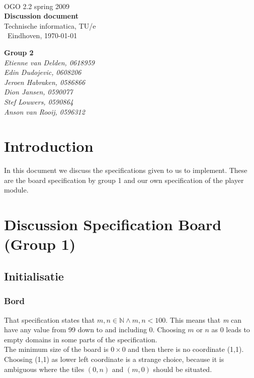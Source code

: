 \documentclass[a4paper,twoside,11pt]{article}
\begin{document}
   \begin{titlepage}
        {\ }\\[5.0cm]
        { {\Large OGO 2.2 spring 2009}}\\[0.2cm]
        {\bf \Huge Discussion document}\\[0.1cm]
        { {\Large {Technische informatica, TU/e} }}\\[1.0cm]
        {\ Eindhoven, \today }\\[0.2cm]
        \begin{flushright}
            {\bf {\small Group 2 }}\\[0.0cm]
            {\em {\small Etienne van Delden, 0618959}}\\
            {\em {\small Edin Dudojevic, 0608206}}\\
            {\em {\small Jeroen Habraken, 0586866}}\\
            {\em {\small Dion Jansen, 0590077 }}\\
            {\em {\small Stef Louwers, 0590864}}\\
            {\em {\small Anson van Rooij, 0596312}}\\[0.5cm]
        \end{flushright}
    \end{titlepage}

    \tableofcontents
\newpage

\section{Introduction} %
\label{cha:introduction}

In this document we discuss the specifications given to us to implement. These are the board specification by group 1 and our own specification of the player module.


\section{Discussion Specification Board (Group 1)} %
\label{cha:discussion_specification_board_group_1_}

\subsection{Initialisatie} %
\label{sec:initialisatie}

  \subsubsection{Bord} %
  \label{sub:bord}
   That specification states that $m, n \in \mathbb{N} \wedge m,n < 100$. This means that \emph{m} can have any value from 99 down to and including 0. Choosing $m$ or $n$ as 0  leads to empty domains in some parts of the specification.\\
   The minimum size of the board is $0 \times 0$ and then there is no coordinate (1,1). Choosing (1,1) as lower left coordinate is a strange choice, because it is ambiguous where the tiles $(0,n)$ and $(m,0)$ should be situated.
\end{document}
